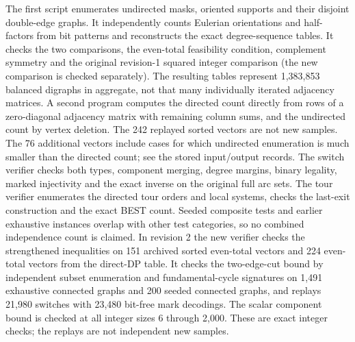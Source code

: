 \documentclass[11pt]{article}
\theoremstyle{remark}\newtheorem{remark}[theorem]{Remark}
\begin{document}
The first script enumerates undirected masks, oriented supports and their disjoint double-edge graphs. It independently counts Eulerian orientations and half-factors from bit patterns and reconstructs the exact degree-sequence tables. It checks the two comparisons, the even-total feasibility condition, complement symmetry and the original revision-1 squared integer comparison (the new comparison is checked separately). The resulting tables represent 1,383,853 balanced digraphs in aggregate, not that many individually iterated adjacency matrices. A second program computes the directed count directly from rows of a zero-diagonal adjacency matrix with remaining column sums, and the undirected count by vertex deletion. The 242 replayed sorted vectors are not new samples. The 76 additional vectors include cases for which undirected enumeration is much smaller than the directed count; see the stored input/output records. The switch verifier checks both types, component merging, degree margins, binary legality, marked injectivity and the exact inverse on the original full arc sets. The tour verifier enumerates the directed tour orders and local systems, checks the last-exit construction and the exact BEST count. Seeded composite tests and earlier exhaustive instances overlap with other test categories, so no combined independence count is claimed. In revision 2 the new verifier checks the strengthened inequalities on 151 archived sorted even-total vectors and 224 even-total vectors from the direct-DP table. It checks the two-edge-cut bound by independent subset enumeration and fundamental-cycle signatures on 1,491 exhaustive connected graphs and 200 seeded connected graphs, and replays 21,980 switches with 23,480 bit-free mark decodings. The scalar component bound is checked at all integer sizes 6 through 2,000. These are exact integer checks; the replays are not independent new samples.
\end{document}
